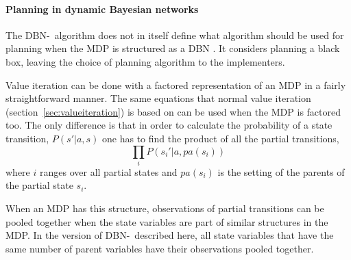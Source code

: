 \paragraph{Planning in dynamic Bayesian networks}

The DBN-\etre\ algorithm does not in itself define what algorithm should be
used for planning when the MDP is structured as a DBN
\parencite{kearns1999efficient}. It considers planning a black box, leaving the
choice of planning algorithm to the implementers. 

Value iteration can be done with a factored representation of an MDP in a
fairly straightforward manner. The same equations that normal value iteration
(section~\ref{sec:valueiteration}) is based on can be used when the MDP is
factored too. The only difference is that in order to calculate the probability
of a state transition, $P(s'| a, s)$ one has to find the product of all the
partial transitions,
\begin{equation}
  \prod\limits _{i} P\left(s_i' | a, pa(s_i)\right)
\end{equation}
where $i$ ranges over all partial states and $pa(s_i)$ is the setting of the
parents of the partial state $s_i$.

When an MDP has this structure, observations of partial transitions can be
pooled together when the state variables are part of similar structures in the
MDP. In the version of DBN-\etre\ described here, all state variables that have
the same number of parent variables have their observations pooled together. 
